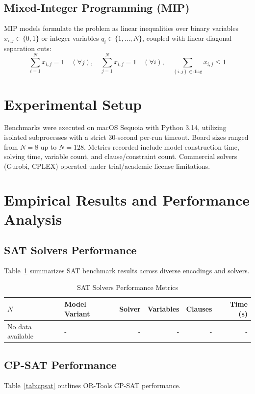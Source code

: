 \documentclass[a4paper,fleqn]{cas-sc}
\begin{document}
\subsection{Mixed-Integer Programming (MIP)}
MIP models formulate the problem as linear inequalities over binary variables $x_{i,j} \in \{0, 1\}$ or integer variables $q_i \in \{1, \dots, N\}$, coupled with linear diagonal separation cuts:
$$\sum_{i=1}^N x_{i,j} = 1 \quad (\forall j), \quad \sum_{j=1}^N x_{i,j} = 1 \quad (\forall i), \quad \sum_{(i,j) \in \text{diag}} x_{i,j} \le 1$$

\section{Experimental Setup}
Benchmarks were executed on macOS Sequoia with Python 3.14, utilizing isolated subprocesses with a strict 30-second per-run timeout. Board sizes ranged from $N = 8$ up to $N = 128$. Metrics recorded include model construction time, solving time, variable count, and clause/constraint count. Commercial solvers (Gurobi, CPLEX) operated under trial/academic license limitations.

\section{Empirical Results and Performance Analysis}

\subsection{SAT Solvers Performance}
Table~\ref{tab:sat} summarizes SAT benchmark results across diverse encodings and solvers.

\begin{table}[H]
\centering
\caption{SAT Solvers Performance Metrics} \label{tab:sat}
\begin{tabular}{llrrrr}
\toprule
$N$ & Model Variant & Solver & Variables & Clauses & Time (s) \\
\midrule
No data available & - & - & - & - & - \\
\bottomrule
\end{tabular}
\end{table}

\subsection{CP-SAT Performance}
Table~\ref{tab:cpsat} outlines OR-Tools CP-SAT performance.
\end{document}
